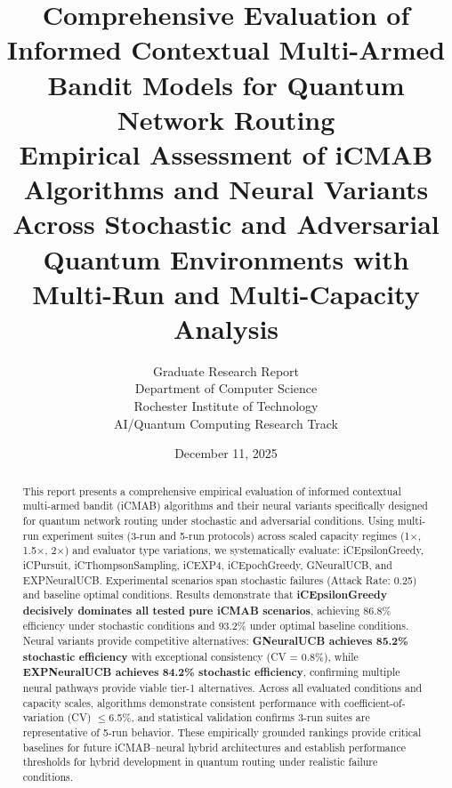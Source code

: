\documentclass[12pt,a4paper]{article}
\title{\textbf{Comprehensive Evaluation of Informed Contextual Multi-Armed Bandit Models for Quantum Network Routing}\\
\large{Empirical Assessment of iCMAB Algorithms and Neural Variants Across Stochastic and Adversarial Quantum Environments with Multi-Run and Multi-Capacity Analysis}}
\author{Graduate Research Report\\
Department of Computer Science\\
Rochester Institute of Technology\\
AI/Quantum Computing Research Track}
\date{December 11, 2025}
\newcommand{\primarytext}[1]{\textcolor{primaryblue}{\textbf{#1}}}
\newcommand{\legacy}[1]{\textcolor{legacycolor}{\textbf{#1}}}
\newcommand{\neural}[1]{\textcolor{neuralcolor}{\textbf{#1}}}
\begin{document}
\maketitle

\begin{abstract}
This report presents a comprehensive empirical evaluation of informed contextual multi-armed bandit (iCMAB) algorithms and their neural variants specifically designed for quantum network routing under stochastic and adversarial conditions. Using multi-run experiment suites (3-run and 5-run protocols) across scaled capacity regimes (1$\times$, 1.5$\times$, 2$\times$) and evaluator type variations, we systematically evaluate: iCEpsilonGreedy, iCPursuit, iCThompsonSampling, iCEXP4, iCEpochGreedy, GNeuralUCB, and EXPNeuralUCB. Experimental scenarios span stochastic failures (Attack Rate: 0.25) and baseline optimal conditions. Results demonstrate that \primarytext{iCEpsilonGreedy decisively dominates all tested pure iCMAB scenarios}, achieving 86.8\% efficiency under stochastic conditions and 93.2\% under optimal baseline conditions. Neural variants provide competitive alternatives: \neural{GNeuralUCB achieves 85.2\% stochastic efficiency} with exceptional consistency (CV = 0.8\%), while \legacy{EXPNeuralUCB achieves 84.2\% stochastic efficiency}, confirming multiple neural pathways provide viable tier-1 alternatives. Across all evaluated conditions and capacity scales, algorithms demonstrate consistent performance with coefficient-of-variation (CV) $\leq$6.5\%, and statistical validation confirms 3-run suites are representative of 5-run behavior. These empirically grounded rankings provide critical baselines for future iCMAB--neural hybrid architectures and establish performance thresholds for hybrid development in quantum routing under realistic failure conditions.
\end{abstract}

\newpage
\tableofcontents

\newpage
\end{document}
